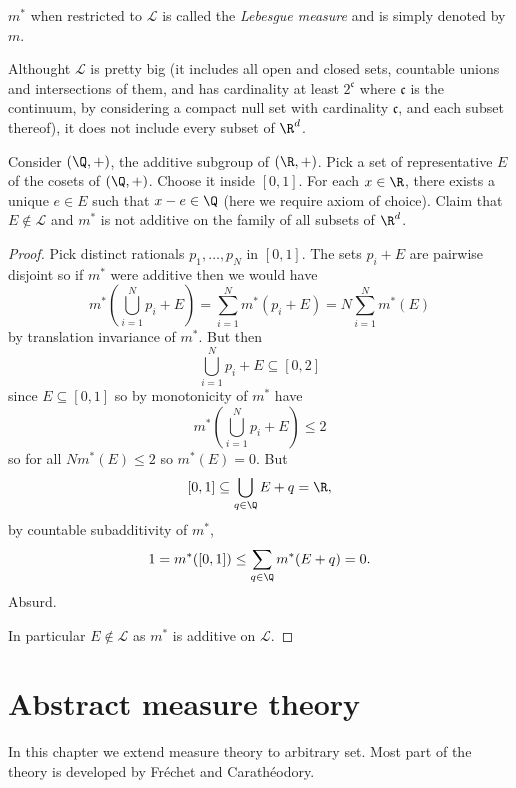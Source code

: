 \documentclass[a4paper]{article}
\begin{document}
\begin{definition}
  \(m^*\) when restricted to \(\mathcal L\) is called the \emph{Lebesgue measure} and is simply denoted by \(m\).
\end{definition}

\begin{eg}
  Althought \(\mathcal L\) is pretty big (it includes all open and closed sets, countable unions and intersections of them, and has cardinality at least \(2^{\mathfrak c}\) where \(\mathfrak c\) is the continuum, by considering a compact null set with cardinality \(\mathfrak c\), and each subset thereof), it does not include every subset of \(\R^d\).
  
  Consider \((\Q, +)\), the additive subgroup of \((\R, +)\). Pick a set of representative \(E\) of the cosets of \((\Q, +)\). Choose it inside \([0, 1]\). For each \(x \in \R\), there exists a unique \(e \in E\) such that \(x - e \in \Q\) (here we require axiom of choice). Claim that \(E \notin \mathcal L\) and \(m^*\) is not additive on the family of all subsets of \(\R^d\).

  \begin{proof}
    Pick distinct rationals \(p_1, \dots, p_N\) in \([0, 1]\). The sets \(p_i + E\) are pairwise disjoint so if \(m^*\) were additive then we would have
    \[
      m^*(\bigcup_{i = 1}^N p_i + E)
      = \sum_{i = 1}^N m^*(p_i + E)
      = N \sum_{i = 1}^N m^*(E)
    \]
    by translation invariance of \(m^*\). But then
    \[
      \bigcup_{i = 1}^N p_i + E \subseteq [0, 2]
    \]
    since \(E \subseteq [0, 1]\) so by monotonicity of \(m^*\) have
    \[
      m^*(\bigcup_{i = 1}^N p_i + E) \leq 2
    \]
    so for all \(N m^*(E) \leq 2\) so \(m^*(E) = 0\). But
    \[
      [0, 1] \subseteq \bigcup_{q \in \Q} E + q = \R,
    \]
    by countable subadditivity of \(m^*\),
    \[
      1 = m^*([0, 1]) \leq \sum_{q \in \Q} m^*(E + q) = 0.
    \]
    Absurd.

    In particular \(E \notin \mathcal L\) as \(m^*\) is additive on \(\mathcal L\).
  \end{proof}
\end{eg}

\section{Abstract measure theory}

In this chapter we extend measure theory to arbitrary set. Most part of the theory is developed by Fréchet and Carathéodory.
\end{document}

